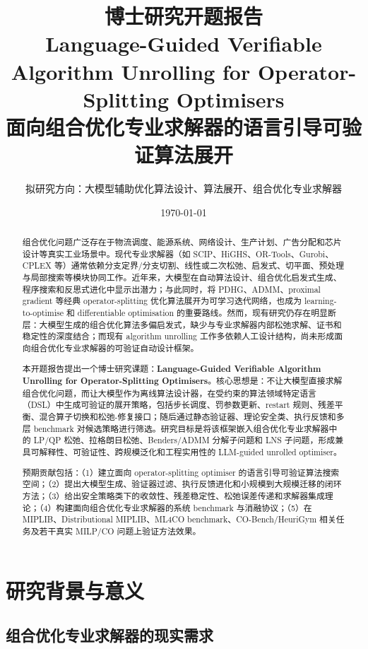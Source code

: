 \documentclass[UTF8,a4paper,12pt,fontset=fandol]{ctexart}
\title{\textbf{博士研究开题报告}\\[0.5em]
\Large Language-Guided Verifiable Algorithm Unrolling for Operator-Splitting Optimisers\\
\large 面向组合优化专业求解器的语言引导可验证算法展开}
\author{拟研究方向：大模型辅助优化算法设计、算法展开、组合优化专业求解器}
\date{\today}
\begin{document}
\maketitle

\begin{abstract}
组合优化问题广泛存在于物流调度、能源系统、网络设计、生产计划、广告分配和芯片设计等真实工业场景中。现代专业求解器（如 SCIP、HiGHS、OR-Tools、Gurobi、CPLEX 等）通常依赖分支定界/分支切割、线性或二次松弛、启发式、切平面、预处理与局部搜索等模块协同工作。近年来，大模型在自动算法设计、组合优化启发式生成、程序搜索和反思式进化中显示出潜力；与此同时，将 PDHG、ADMM、proximal gradient 等经典 operator-splitting 优化算法展开为可学习迭代网络，也成为 learning-to-optimise 和 differentiable optimisation 的重要路线。然而，现有研究仍存在明显断层：大模型生成的组合优化算法多偏启发式，缺少与专业求解器内部松弛求解、证书和稳定性的深度结合；而现有 algorithm unrolling 工作多依赖人工设计结构，尚未形成面向组合优化专业求解器的可验证自动设计框架。

本开题报告提出一个博士研究课题：\textbf{Language-Guided Verifiable Algorithm Unrolling for Operator-Splitting Optimisers}。核心思想是：不让大模型直接求解组合优化问题，而让大模型作为离线算法设计器，在受约束的算法领域特定语言（DSL）中生成可验证的展开策略，包括步长调度、罚参数更新、restart 规则、残差平衡、混合算子切换和松弛-修复接口；随后通过静态验证器、理论安全类、执行反馈和多层 benchmark 对候选策略进行筛选。研究目标是将该框架嵌入组合优化专业求解器中的 LP/QP 松弛、拉格朗日松弛、Benders/ADMM 分解子问题和 LNS 子问题，形成兼具可解释性、可验证性、跨规模泛化和工程实用性的 LLM-guided unrolled optimiser。

预期贡献包括：（1）建立面向 operator-splitting optimiser 的语言引导可验证算法搜索空间；（2）提出大模型生成、验证器过滤、执行反馈进化和小规模到大规模迁移的闭环方法；（3）给出安全策略类下的收敛性、残差稳定性、松弛误差传递和求解器集成理论；（4）构建面向组合优化专业求解器的系统 benchmark 与消融协议；（5）在 MIPLIB、Distributional MIPLIB、ML4CO benchmark、CO-Bench/HeuriGym 相关任务及若干真实 MILP/CO 问题上验证方法效果。
\end{abstract}

\tableofcontents
\newpage

\section{研究背景与意义}

\subsection{组合优化专业求解器的现实需求}
\end{document}
